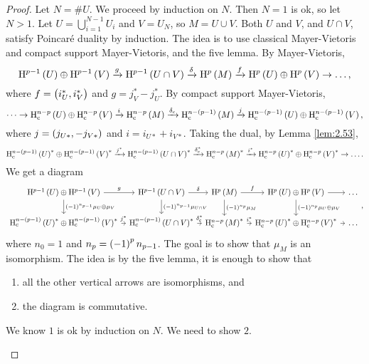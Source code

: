 \begin{proof}
Let $ N = \#U $. We proceed by induction on $ N $. Then $ N = 1 $ is ok, so let $ N > 1 $. Let $ U = \bigcup_{i = 1}^{N - 1} U_i $ and $ V = U_N $, so $ M = U \cup V $. Both $ U $ and $ V $, and $ U \cap V $, satisfy Poincar\'e duality by induction. The idea is to use classical Mayer-Vietoris and compact support Mayer-Vietoris, and the five lemma. By Mayer-Vietoris,
$$ \H^{p - 1}\br{U} \oplus \H^{p - 1}\br{V} \xrightarrow{g} \H^{p - 1}\br{U \cap V} \xrightarrow{\delta} \H^p\br{M} \xrightarrow{f} \H^p\br{U} \oplus \H^p\br{V} \to \dots, $$
where $ f = \br{i_U^*, i_V^*} $ and $ g = j_V^* - j_U^* $. By compact support Mayer-Vietoris,
$$ \dots \to \H_\c^{n - p}\br{U} \oplus \H_\c^{n - p}\br{V} \xrightarrow{i} \H_\c^{n - p}\br{M} \xrightarrow{\delta_\c} \H_\c^{n - \br{p - 1}}\br{M} \xrightarrow{j} \H_\c^{n - \br{p - 1}}\br{U} \oplus \H_\c^{n - \br{p - 1}}\br{V}, $$
where $ j = \br{j_{U*}, -j_{V*}} $ and $ i = i_{U*} + i_{V*} $. Taking the dual, by Lemma \ref{lem:2.53},
$$ \H_\c^{n - \br{p - 1}}\br{U}^* \oplus \H_\c^{n - \br{p - 1}}\br{V}^* \xrightarrow{j^*} \H_\c^{n - \br{p - 1}}\br{U \cap V}^* \xrightarrow{\delta_\c^*} \H_\c^{n - p}\br{M}^* \xrightarrow{i^*} \H_\c^{n - p}\br{U}^* \oplus \H_\c^{n - p}\br{V}^* \to \dots. $$
We get a diagram
$$
\begin{tikzcd}[column sep=tiny]
\H^{p - 1}\br{U} \oplus \H^{p - 1}\br{V} \arrow{r}{g} \arrow{d}{\br{-1}^{n_{p - 1}}\mu_U \oplus \mu_V} & \H^{p - 1}\br{U \cap V} \arrow{r}{\delta} \arrow{d}{\br{-1}^{n_{p - 1}}\mu_{U \cap V}} & \H^p\br{M} \arrow{r}{f} \arrow{d}{\br{-1}^{n_p}\mu_M} & \H^p\br{U} \oplus \H^p\br{V} \arrow{r} \arrow{d}{\br{-1}^{n_p}\mu_U \oplus \mu_V} & \dots \\
\H_\c^{n - \br{p - 1}}\br{U}^* \oplus \H_\c^{n - \br{p - 1}}\br{V}^* \arrow{r}{j^*} & \H_\c^{n - \br{p - 1}}\br{U \cap V}^* \arrow{r}{\delta_\c^*} & \H_\c^{n - p}\br{M}^* \arrow{r}{i^*} & \H_\c^{n - p}\br{U}^* \oplus \H_\c^{n - p}\br{V}^* \arrow{r} & \dots
\end{tikzcd},
$$
where $ n_0 = 1 $ and $ n_p = \br{-1}^pn_{p - 1} $. The goal is to show that $ \mu_M $ is an isomorphism. The idea is by the five lemma, it is enough to show that
\begin{enumerate}
\item all the other vertical arrows are isomorphisms, and
\item the diagram is commutative.
\end{enumerate}
We know $ 1 $ is ok by induction on $ N $. We need to show $ 2 $.
\begin{itemize}

\end{itemize}
\end{proof}
